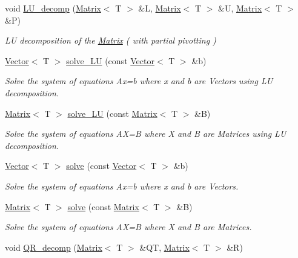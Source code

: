 \begin{DoxyCompactItemize}
void \hyperlink{classLuna_1_1Matrix_a5a351581d939027d62d77a87a42bbbcd}{L\+U\+\_\+decomp} (\hyperlink{classLuna_1_1Matrix}{Matrix}$<$ T $>$ \&L, \hyperlink{classLuna_1_1Matrix}{Matrix}$<$ T $>$ \&U, \hyperlink{classLuna_1_1Matrix}{Matrix}$<$ T $>$ \&P)
\begin{DoxyCompactList}\small\item\em LU decomposition of the \hyperlink{classLuna_1_1Matrix}{Matrix} ( with partial pivotting ) \end{DoxyCompactList}\item 
\hyperlink{classLuna_1_1Vector}{Vector}$<$ T $>$ \hyperlink{classLuna_1_1Matrix_a9e065767864b479a535c4eccce35147d}{solve\+\_\+\+LU} (const \hyperlink{classLuna_1_1Vector}{Vector}$<$ T $>$ \&b)
\begin{DoxyCompactList}\small\item\em Solve the system of equations Ax=b where x and b are Vectors using LU decomposition. \end{DoxyCompactList}\item 
\hyperlink{classLuna_1_1Matrix}{Matrix}$<$ T $>$ \hyperlink{classLuna_1_1Matrix_a312b9899c2857c2028f72146d607df8b}{solve\+\_\+\+LU} (const \hyperlink{classLuna_1_1Matrix}{Matrix}$<$ T $>$ \&B)
\begin{DoxyCompactList}\small\item\em Solve the system of equations AX=B where X and B are Matrices using LU decomposition. \end{DoxyCompactList}\item 
\hyperlink{classLuna_1_1Vector}{Vector}$<$ T $>$ \hyperlink{classLuna_1_1Matrix_abc78c81c129e2bb7ca9f6ee6db2611a9}{solve} (const \hyperlink{classLuna_1_1Vector}{Vector}$<$ T $>$ \&b)
\begin{DoxyCompactList}\small\item\em Solve the system of equations Ax=b where x and b are Vectors. \end{DoxyCompactList}\item 
\hyperlink{classLuna_1_1Matrix}{Matrix}$<$ T $>$ \hyperlink{classLuna_1_1Matrix_ac1793bde8e6a66d6ba1a094d36deca18}{solve} (const \hyperlink{classLuna_1_1Matrix}{Matrix}$<$ T $>$ \&B)
\begin{DoxyCompactList}\small\item\em Solve the system of equations AX=B where X and B are Matrices. \end{DoxyCompactList}\item 
void \hyperlink{classLuna_1_1Matrix_aad8367cf9e292301e40c24c4011a2e8f}{Q\+R\+\_\+decomp} (\hyperlink{classLuna_1_1Matrix}{Matrix}$<$ T $>$ \&QT, \hyperlink{classLuna_1_1Matrix}{Matrix}$<$ T $>$ \&R)

\end{DoxyCompactItemize}
